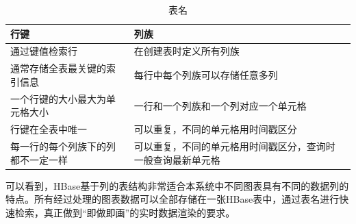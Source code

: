 \begin{table}[!htbp]
	\centering
	\caption{表名}
	\label{tab:my-table}
	\begin{tabular}{|l|l|l|}
		\hline
		行键 & 列族 \\ \hline
		通过键值检索行 & 在创建表时定义所有列族  \\ \hline
		通常存储全表最关键的索引信息 & 每行中每个列族可以存储任意多列 \\ \hline
		一个行键的大小最大为单元格大小 & 一行和一个列族和一个列对应一个单元格 \\ \hline
        行键在全表中唯一 & 可以重复，不同的单元格用时间戳区分 \\ \hline
        每一行的每个列族下的列都不一定一样 & 可以重复，不同的单元格用时间戳区分，查询时一般查询最新单元格 \\ \hline
	\end{tabular}
\end{table}

可以看到，HBase基于列的表结构非常适合本系统中不同图表具有不同的数据列的特点。所有经过处理的图表数据可以全部存储在一张HBase表中，通过表名进行快速检索，真正做到“即做即画”的实时数据渲染的要求。

